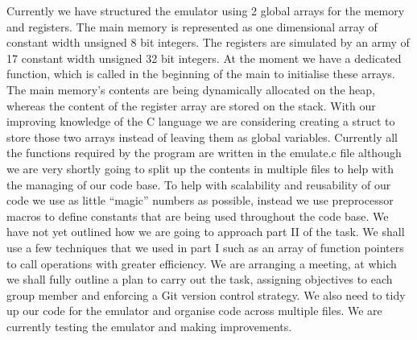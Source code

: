 \documentclass[11pt]{article}
\begin{document}
	Currently we have structured the emulator using 2 global arrays for the memory and registers. The main memory is represented as one dimensional array of constant width unsigned 8 bit integers. The registers are simulated by an army of 17 constant width unsigned 32 bit integers. At the moment we have a dedicated function, which is called in the beginning of the main to initialise these arrays. The main memory’s contents are being dynamically allocated on the heap, whereas the content of the register array are stored on the stack. With our improving knowledge of the C language we are considering creating a struct to store those two arrays instead of leaving them as global variables. Currently all the functions required by the program are written in the emulate.c file although we are very shortly going to split up the contents in multiple files to help with the managing of our code base. To help with scalability and reusability of our code we use as little “magic” numbers as possible, instead we use preprocessor macros to define constants that are being used throughout the code base. 
	We have not yet outlined how we are going to approach part II of the task. We shall use a few techniques that we used in part I such as an array of function pointers to call operations with greater efficiency. We are arranging a meeting, at which we shall fully outline a plan to carry out the task, assigning objectives to each group member and enforcing a Git version control strategy. We also need to tidy up our code for the emulator and organise code across multiple files. We are currently testing the emulator and making improvements.
	
\end{document}
